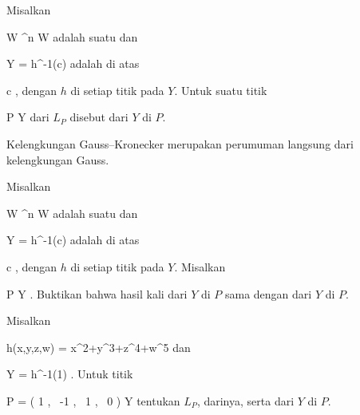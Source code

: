 Misalkan

\mavergleichskette
{\vergleichskette
{ W
}
{ \subseteq }{ \R^n
}
{  }{
}
{    }{
}
{   }{
}
}
{}{}{}
 { W } { \R
} {}
adalah suatu
dan

\mavergleichskette
{\vergleichskette
{ Y
}
{ = }{ h^{-1}(c)
}
{  }{
}
{    }{
}
{   }{
}
}
{}{}{}
adalah
di atas

\mavergleichskette
{\vergleichskette
{ c
}
{ \in }{ \R
}
{  }{
}
{    }{
}
{   }{
}
}
{}{}{,}
dengan $h$
di setiap titik pada $Y$. Untuk suatu titik

\mavergleichskette
{\vergleichskette
{ P
}
{ \in }{ Y
}
{  }{
}
{    }{
}
{   }{
}
}
{}{}{}
dari
$L_P$ disebut
dari $Y$ di $P$.

Kelengkungan Gauss--Kronecker merupakan perumuman langsung dari kelengkungan Gauss.

{}
{

Misalkan

\mavergleichskette
{\vergleichskette
{ W
}
{ \subseteq }{ \R^n
}
{  }{
}
{    }{
}
{   }{
}
}
{}{}{}
 { W } { \R
} {}
adalah suatu
dan

\mavergleichskette
{\vergleichskette
{ Y
}
{ = }{ h^{-1}(c)
}
{  }{
}
{    }{
}
{   }{
}
}
{}{}{}
adalah
di atas

\mavergleichskette
{\vergleichskette
{ c
}
{ \in }{ \R
}
{  }{
}
{    }{
}
{   }{
}
}
{}{}{,}
dengan $h$
di setiap titik pada $Y$. Misalkan

\mavergleichskette
{\vergleichskette
{ P
}
{ \in }{ Y
}
{  }{
}
{    }{
}
{   }{
}
}
{}{}{.}
Buktikan bahwa hasil kali
dari $Y$ di $P$ sama dengan
dari $Y$ di $P$.

}
{} {}

{}
{

Misalkan

\mavergleichskettedisp
{\vergleichskette
{ h(x,y,z,w)
}
{ =} { x^2+y^3+z^4+w^5
}
{ } {
}
{ } {
}
{ } {
}
}
{}{}{}
dan

\mavergleichskette
{\vergleichskette
{ Y
}
{ = }{ h^{-1}(1)
}
{  }{
}
{    }{
}
{   }{
}
}
{}{}{.}
Untuk titik

\mavergleichskettedisp
{\vergleichskette
{ P
}
{ =} { \left(  1   , \,   -1  , \,   1 , \,   0                \right)
}
{ \in} { Y
}
{ } {
}
{ } {
}
}
{}{}{}
tentukan
$L_P$, 
darinya, serta
dari $Y$ di $P$.

}
{} {}

